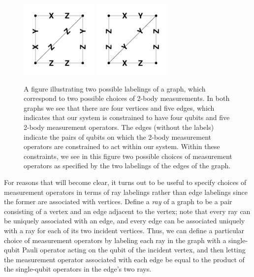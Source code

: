 \documentclass[twocolumn,showpacs,preprintnumbers,amsmath,amssymb,nofootinbib,pra,floatfix]{revtex4-1}
\begin{document}
\begin{figure}
\begin{center}
\includegraphics[width=1.5in]{2labelings-1}
\includegraphics[width=1.5in]{2labelings-2}
\end{center}
\caption{
\label{figure:2labelings}
A figure illustrating two possible labelings of a graph, which correspond to two possible choices of 2-body measurements.  In both graphs we see that there are four vertices and five edges, which indicates that our system is constrained to have four qubits and five 2-body measurement operators.  The edges (without the labels) indicate the pairs of qubits on which the 2-body measurement operators are constrained to act within our system.  Within these constraints, we see in this figure two possible choices of measurement operators as specified by the two labelings of the edges of the graph.
}
\end{figure}

For reasons that will become clear, it turns out to be useful to specify choices of measurement operators in terms of ray labelings rather than edge labelings since the former are associated with vertices.  Define a \emph{ray} of a graph to be a pair consisting of a vertex and an edge adjacent to the vertex;  note that every ray can be uniquely associated with an edge, and every edge can be associated uniquely with a ray for each of its two incident vertices.  Thus, we can define a particular choice of measurement operators by labeling each ray in the graph with a single-qubit Pauli operator acting on the qubit of the incident vertex, and then letting the measurement operator associated with each edge be equal to the product of the single-qubit operators in the edge's two rays.
\end{document}
